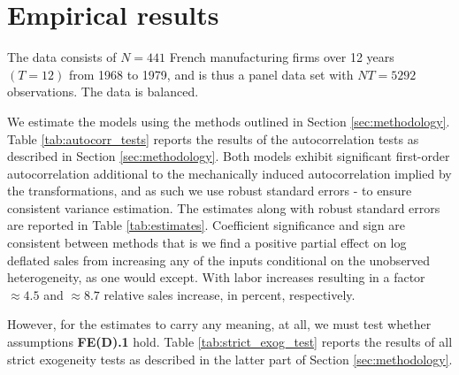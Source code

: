 \section{Empirical results}

The data consists of $N = 441$ French manufacturing firms over 12 years $(T=12)$ from 1968 to 1979, and is thus a panel data set with $NT = 5292$ observations. The data is balanced.  

We estimate the models using the methods outlined in Section \ref{sec:methodology}. Table \ref{tab:autocorr_tests} reports the results of the autocorrelation tests as described in Section \ref{sec:methodology}. Both models exhibit significant first-order autocorrelation additional to the mechanically induced autocorrelation implied by the transformations, and as such we use robust standard errors  - to ensure consistent variance estimation. The estimates along with robust standard errors are reported in Table \ref{tab:estimates}. Coefficient significance and sign are consistent between methods that is we find a positive partial effect on log deflated sales from increasing any of the inputs conditional on the unobserved heterogeneity, as one would except. With labor increases resulting in a factor $\approx 4.5$ and $\approx 8.7$ relative sales increase, in percent, respectively. 



However, for the estimates to carry any meaning, at all, we must test whether assumptions \textbf{FE(D).1} hold. Table \ref{tab:strict_exog_test} reports the results of all strict exogeneity tests as described in the latter part of Section \ref{sec:methodology}.



